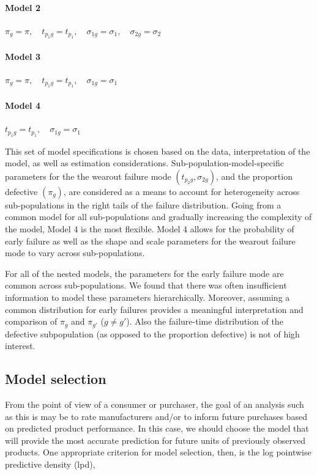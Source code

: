 \documentclass[12pt]{article}
\begin{document}
\paragraph{Model 2} $\pi_{g} = \pi,\quad t_{p_{1}g} = t_{p_1},\quad \sigma_{1g}=\sigma_1,\quad \sigma_{2g} = \sigma_2$
\paragraph{Model 3} $\pi_{g} = \pi,\quad  t_{p_{1}g}= t_{p_1},\quad \sigma_{1g}=\sigma_1$
\paragraph{Model 4} $t_{p_{1}g}= t_{p_1},\quad \sigma_{1g}=\sigma_1$


This set of model specifications is chosen based on the data, interpretation of the model, as well as estimation considerations.  Sub-population-model-specific parameters for the the wearout failure mode $(t_{p_{2}g},\sigma_{2g})$, and the proportion defective $(\pi_g)$, are considered as a means to account for heterogeneity across sub-populations in the right tails of the failure distribution.  Going from a common model for all sub-populations and gradually increasing the complexity of the model, Model 4 is the most flexible.  Model 4 allows for the probability of early failure as well as the shape and scale parameters for the wearout failure mode to vary across sub-populations.

For all of the nested models, the parameters for the early failure mode are common across sub-populations.  We found that there was often insufficient information to model these parameters hierarchically.  Moreover, assuming a common distribution for early failures provides a meaningful interpretation and comparison of $\pi_g$ and $\pi_{g'}$ ($g \neq g'$). Also the failure-time distribution of the defective subpopulation (as opposed to the proportion defective) is not of high interest.

\subsection{Model selection}
From the point of view of a consumer or purchaser, the goal of an analysis such as this is may be to rate manufacturers and/or to inform future purchases based on predicted product performance. In this case, we should choose the model that will provide the most accurate prediction for future units of previously observed products. One appropriate criterion for model selection, then, is the log pointwise predictive density (lpd),
\end{document}
